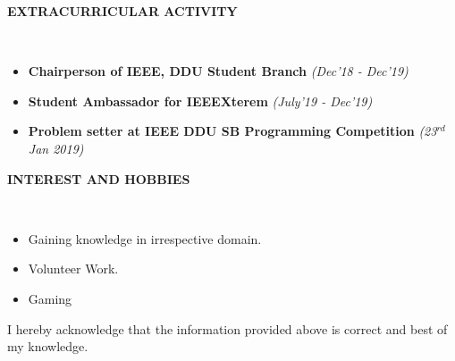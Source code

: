 \documentclass[a4paper,10pt]{article}
\newcommand{\isep}{-2 pt}
\newcommand{\lsep}{-0.5cm}
\newcommand{\resheading}[1]{{\small \colorbox{mygrey}{\begin{minipage}{0.975\textwidth}{\textbf{#1 \vphantom{p\^{E}}}}\end{minipage}}}}
\begin{document}
\begin{itemize}
	
\end{itemize}


\resheading{\textbf{EXTRACURRICULAR ACTIVITY} }\\[\lsep]
\begin{itemize}\itemsep \isep
    \item \textbf{Chairperson of IEEE, DDU Student Branch}\emph{ (Dec'18 - Dec'19)}
    \item \textbf{Student Ambassador for IEEEXterem }\emph{(July'19 - Dec'19)}
    \item \textbf{Problem setter at IEEE DDU SB Programming Competition} 
    \emph{(23$^{rd}$ Jan 2019)}
    
\end{itemize}



\resheading{\textbf{INTEREST AND HOBBIES} }\\[\lsep]
\begin{itemize}\itemsep \isep
\item \noindent Gaining knowledge in irrespective domain.
\item \noindent Volunteer Work.
\item \noindent Gaming
\end{itemize}



\indent I hereby acknowledge that the information provided above is correct and best of my knowledge.\\
\end{document}
